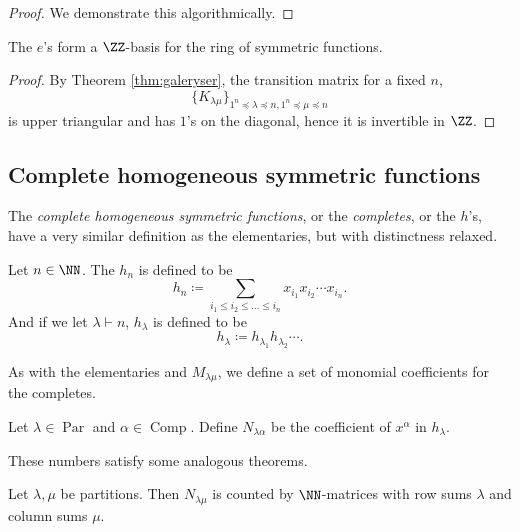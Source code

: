 \documentclass{article}
\DeclareMathOperator{\Par}{Par}
\DeclareMathOperator{\Com}{Comp}
\begin{document}
\begin{proof}
    We demonstrate this algorithmically. 
    
\end{proof}

\begin{theorem} The $e$'s form a $\ZZ$-basis for the ring of symmetric functions.
\end{theorem}

\begin{proof}
    By Theorem \ref{thm:galeryser}, the transition matrix for a fixed $n$,
    \[
        \{K_{\lambda\mu}\}_{1^n \preceq \lambda \preceq n, 1^n \preceq \mu \preceq n}
    \]
    is upper triangular and has $1$'s on the diagonal, hence it is invertible in $\ZZ$. 
\end{proof}

\subsection{Complete homogeneous symmetric functions}

The \textit{complete homogeneous symmetric functions}, or the \textit{completes}, or the $h$'s, have a very similar definition as the elementaries, but with distinctness relaxed.

\begin{definition}
    Let $n\in\NN$. The  $h_n$ is defined to be
    \[
        h_n \coloneq \sum_{i_1\leq i_2\leq\ldots\leq i_n} x_{i_1}x_{i_2}\cdots x_{i_n}.
    \]
    And if we let $\lambda \vdash n$, $h_\lambda$ is defined to be
    \[
        h_\lambda \coloneq h_{\lambda_1}h_{\lambda_2}\cdots.
    \]
\end{definition}

As with the elementaries and $M_{\lambda\mu}$, we define a set of monomial coefficients for the completes.

\begin{definition}
    Let $\lambda \in \Par$ and $\alpha \in \Com$. Define $N_{\lambda\alpha}$ be the coefficient of $x^\alpha$ in $h_\lambda$.
\end{definition}

These numbers satisfy some analogous theorems.

\begin{theorem} \label{thm:h2mCombInterpretation}
    Let $\lambda, \mu$ be partitions. Then $N_{\lambda\mu}$ is counted by $\NN$-matrices with row sums $\lambda$ and column sums $\mu$.
\end{theorem}
\end{document}
